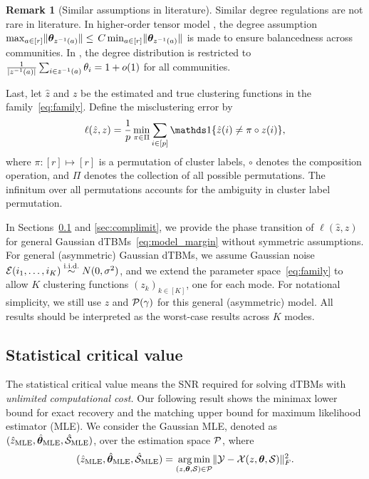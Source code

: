 \documentclass[journal]{IEEEtran}
\theoremstyle{definition}
\theoremstyle{definition}
\newtheorem{rmk}{Remark}
\begin{document}
\begin{rmk}[Similar assumptions in literature]
Similar degree regulations are not rare in literature. In higher-order tensor model \citep{ke2019community}, the degree assumption $\max_{a\in[r]} \lVert\boldsymbol{\theta}_{z^{-1}(a)}\rVert \leq $ $ C \min_{a\in[r]}\lVert\boldsymbol{\theta}_{z^{-1}(a)}\rVert$ is made to ensure balancedness across communities. %
In \cite{gao2018community}, the degree distribution is restricted to ${1\over |z^{-1}(a)|}\sum_{i\in z^{-1}(a)}\theta_i=1+o(1)$ for all communities. 
\end{rmk}

Last, let $\hat z$ and $z$ be the estimated and true clustering functions in the family~\eqref{eq:family}. Define the misclustering error by
\[
\ell(\hat z, z)={1\over p}\min_{\pi \in \Pi}\sum_{i\in[p]}\ind\{\hat z(i)\neq \pi \circ z(i)\},
\]
where $\pi: [r] \mapsto [r]$ is a permutation of cluster labels, $\circ$ denotes the composition operation, and $\Pi$ denotes the collection of all possible permutations. The infinitum over all permutations accounts for the ambiguity in cluster label permutation. 

In Sections~\ref{sec:statlimit} and \ref{sec:complimit}, we provide the phase transition of $\ell (\hat z, z)$ for general Gaussian dTBMs~\eqref{eq:model_margin} without symmetric assumptions. For general (asymmetric) Gaussian dTBMs, we assume Gaussian noise $\mathcal{E}(i_1,\ldots,i_K)\stackrel{\text{i.i.d.}}{\sim} N(0,\sigma^2)$, and we extend the parameter space~\eqref{eq:family} to allow $K$ clustering functions $(z_k)_{k\in[K]}$, one for each mode. For notational simplicity, we still use $z$ and $\mathcal{P}(\gamma)$ for this general (asymmetric) model. All results should be interpreted as the worst-case results across $K$ modes. 

\subsection{Statistical critical value}\label{sec:statlimit}
The statistical critical value means the SNR required for solving dTBMs with \emph{unlimited computational cost.}   Our following result shows the minimax lower bound for exact recovery and the matching upper bound for maximum likelihood estimator (MLE).  We consider the Gaussian MLE, denoted as $(\hat z_{\text{MLE}}, \hat {\boldsymbol{\theta}}_{\text{MLE}}, \hat {\mathcal{S}}_{\text{MLE}})$, over the estimation space $\mathcal{P}$, where 
\begin{equation}\label{eq:mle}
    (\hat z_{\text{MLE}}, \hat \mtheta_{\text{MLE}}, \hat \tS_{\text{MLE}}) = \argmin_{ (z, \mtheta, \tS) \in \tP} \onormSize{}{\tY - \tX(z,\mtheta, \tS)}_F^2.
\end{equation}
\end{document}
